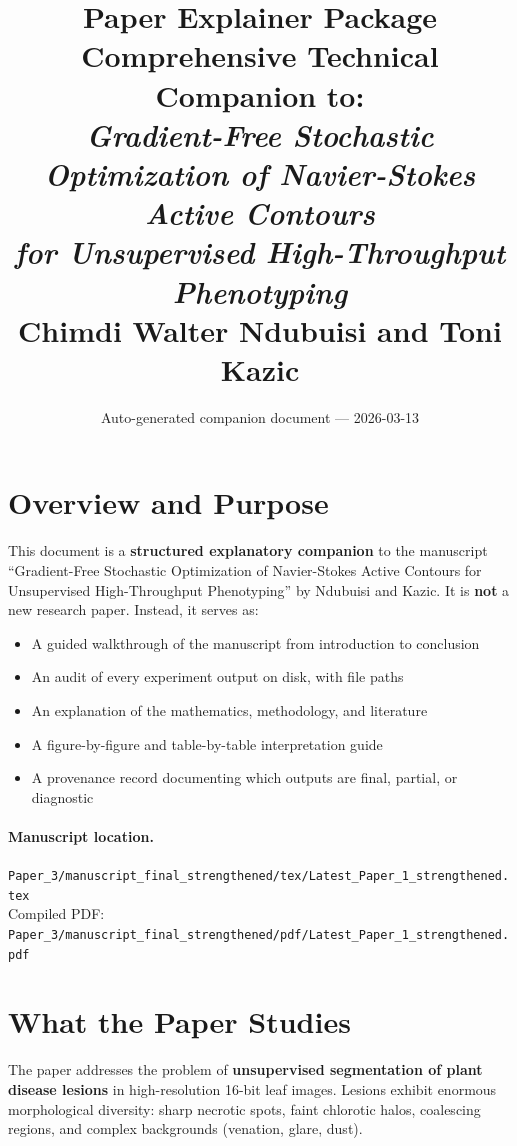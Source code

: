 \documentclass[11pt,a4paper]{article}
\title{\textbf{Paper Explainer Package}\\[0.5em]
\large Comprehensive Technical Companion to:\\[0.3em]
\textit{Gradient-Free Stochastic Optimization of Navier-Stokes Active Contours\\for Unsupervised High-Throughput Phenotyping}\\[0.5em]
\normalsize Chimdi Walter Ndubuisi and Toni Kazic}
\author{Auto-generated companion document --- 2026-03-13}
\date{}
\newcommand{\filepath}[1]{\texttt{\small #1}}
\begin{document}
\maketitle
\tableofcontents
\newpage

\section{Overview and Purpose}

This document is a \textbf{structured explanatory companion} to the manuscript
``Gradient-Free Stochastic Optimization of Navier-Stokes Active Contours for
Unsupervised High-Throughput Phenotyping'' by Ndubuisi and Kazic.  It is
\textbf{not} a new research paper.  Instead, it serves as:

\begin{itemize}[nosep]
  \item A guided walkthrough of the manuscript from introduction to conclusion
  \item An audit of every experiment output on disk, with file paths
  \item An explanation of the mathematics, methodology, and literature
  \item A figure-by-figure and table-by-table interpretation guide
  \item A provenance record documenting which outputs are final, partial, or diagnostic
\end{itemize}

\paragraph{Manuscript location.}
\filepath{Paper\_3/manuscript\_final\_strengthened/tex/Latest\_Paper\_1\_strengthened.tex}\\
Compiled PDF: \filepath{Paper\_3/manuscript\_final\_strengthened/pdf/Latest\_Paper\_1\_strengthened.pdf}

\section{What the Paper Studies}

The paper addresses the problem of \textbf{unsupervised segmentation of plant disease lesions} in high-resolution 16-bit leaf images.  Lesions exhibit enormous morphological diversity: sharp necrotic spots, faint chlorotic halos, coalescing regions, and complex backgrounds (venation, glare, dust).
\end{document}
